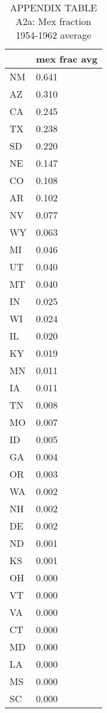 \begin{table}[htbp]
\caption{\label{clabel} APPENDIX TABLE A2a: Mex fraction 1954-1962 average}\centering\medskip
\begin{tabular}{|l|l|}\hline  
 & mex frac avg  \\ \hline  
NM & 0.641 \\ \hline 
AZ & 0.310 \\ \hline 
CA & 0.245 \\ \hline 
TX & 0.238 \\ \hline 
SD & 0.220 \\ \hline 
NE & 0.147 \\ \hline 
CO & 0.108 \\ \hline 
AR & 0.102 \\ \hline 
NV & 0.077 \\ \hline 
WY & 0.063 \\ \hline 
MI & 0.046 \\ \hline 
UT & 0.040 \\ \hline 
MT & 0.040 \\ \hline 
IN & 0.025 \\ \hline 
WI & 0.024 \\ \hline 
IL & 0.020 \\ \hline 
KY & 0.019 \\ \hline 
MN & 0.011 \\ \hline 
IA & 0.011 \\ \hline 
TN & 0.008 \\ \hline 
MO & 0.007 \\ \hline 
ID & 0.005 \\ \hline 
GA & 0.004 \\ \hline 
OR & 0.003 \\ \hline 
WA & 0.002 \\ \hline 
NH & 0.002 \\ \hline 
DE & 0.002 \\ \hline 
ND & 0.001 \\ \hline 
KS & 0.001 \\ \hline 
OH & 0.000 \\ \hline 
VT & 0.000 \\ \hline 
VA & 0.000 \\ \hline 
CT & 0.000 \\ \hline 
MD & 0.000 \\ \hline 
LA & 0.000 \\ \hline 
MS & 0.000 \\ \hline 
SC & 0.000 \\ \hline 

\end{tabular}
\end{table}
